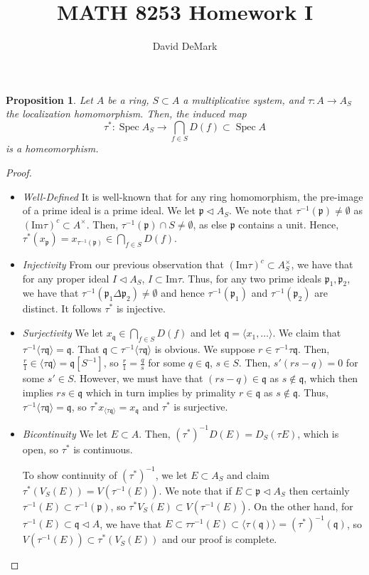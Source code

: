 \documentclass[english]{article}
\title{MATH 8253 Homework I}
\author{David DeMark}
\date{\due}
\DeclareMathOperator{\spec}{Spec}
\newcommand{\pfr}{\mathfrak{p}}
\newcommand{\qfr}{\mathfrak{q}}
\newcommand{\prob}[1]{\setcounter{section}{#1-1}\section{}}
\newtheorem*{proposition*}{Proposition}
\theoremstyle{remark}
\theoremstyle{definition}
\newcommand{\im}{\mathrm{Im}}
\begin{document}
\maketitle\prob{1} \begin{proposition*}
	Let $A$ be a ring, $S\subset A$ a multiplicative system, and $\tau:A\to A_S$ the localization homomorphism. Then, the induced map $$\tau^*:\spec A_S\to \bigcap_{f\in S} D(f)\subset\spec A$$ is a homeomorphism.
\end{proposition*}
\begin{proof}
	\begin{itemize}
		\item \emph{Well-Defined} It is well-known that for any ring homomorphism, the pre-image of a prime ideal is a prime ideal. We let $\pfr\triangleleft A_S$. We note that $\tau^{-1}(\pfr)\neq \emptyset$ as $(\im \tau)^c\subset A^\times$. Then, $\tau^{-1}(\pfr)\cap S\neq \emptyset$, as else $\pfr$ contains a unit. Hence, $\tau^*(x_\pfr)=x_{\tau^{-1}(\pfr)}\in \bigcap_{f\in S}D(f)$.
		\item \emph{Injectivity} From our previous observation that $(\im \tau)^c\subset A_S^\times$, we have that for any proper ideal $I\triangleleft A_S$, $I\subset \im \tau$. Thus, for any two prime ideals $\pfr_1,\pfr_2$, we have that $\tau^{-1}(\pfr_1\Delta \pfr_2)\neq\emptyset$ and hence $\tau^{-1}(\pfr_1)$ and $\tau^{-1}(\pfr_2)$ are distinct. It follows $\tau^*$ is injective. 
		\item \emph{Surjectivity} We let $x_\qfr\in \bigcap_{f\in S}D(f)$ and let $\qfr=\langle x_1,\hdots\rangle $. We claim that $\tau^{-1}\langle\tau \qfr\rangle=\qfr$. That $\qfr\subset \tau^{-1}\langle\tau \qfr\rangle$ is obvious. We suppose $r\in \tau^{-1}\tau \qfr$. Then, $\frac{r}{1}\in \langle\tau \qfr\rangle=\qfr[S^{-1}]$, so $\frac{r}{1}=\frac{q}{s}$ for some $q\in \qfr$, $s\in S$. Then, $s'(rs-q)=0$ for some $s'\in S$. However, we must have that $(rs-q)\in \qfr$ as $s\notin \qfr$, which then implies $rs\in \qfr$ which in turn implies by primality $r\in \qfr$ as $s\notin \qfr$. Thus, $\tau^{-1}\langle \tau \qfr\rangle=\qfr$, so $\tau^{*}x_{\langle \tau \qfr\rangle}=x_\qfr$ and $\tau^{*}$ is surjective.
		\item \emph{Bicontinuity} We let $E\subset A$. Then, $(\tau^*)^{-1}D(E)=D_S(\tau E)$, which is open, so $\tau^*$ is continuous. 
		
		To show continuity of $(\tau^*)^{-1}$, we let $E\subset A_S$ and claim $\tau^*(V_S(E))=V(\tau^{-1}(E))$. We note that if $E\subset \pfr\triangleleft A_S$ then certainly $\tau^{-1}(E)\subset \tau^{-1}(\pfr)$, so $\tau^*V_S(E)\subset V(\tau^{-1}(E))$. On the other hand, for $\tau^{-1}(E)\subset\qfr\triangleleft A$, we have that $E\subset \tau\tau^{-1}(E)\subset \langle\tau(\qfr)\rangle=(\tau^*)^{-1}(\qfr)$, so $V(\tau^{-1}(E))\subset \tau^*(V_S(E))$ and our proof is complete.
	\end{itemize}
	

\end{proof}
\end{document}
